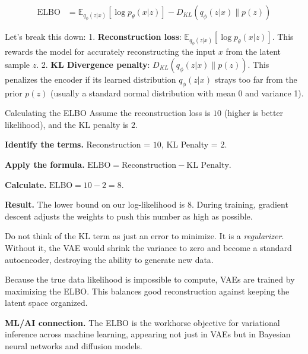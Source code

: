 \documentclass[a4paper,11pt]{article}
\begin{document}
\begin{align}
  \text{ELBO} &= \mathbb{E}_{q_\phi(z|x)} \left[ \log p_\theta(x|z) \right] - D_{KL}(q_\phi(z|x) \parallel p(z))
\end{align}

Let's break this down:
1. \textbf{Reconstruction loss}: $\mathbb{E}_{q_\phi(z|x)} \left[ \log p_\theta(x|z) \right]$. This rewards the model for accurately reconstructing the input $x$ from the latent sample $z$.
2. \textbf{KL Divergence penalty}: $D_{KL}(q_\phi(z|x) \parallel p(z))$. This penalizes the encoder if its learned distribution $q_\phi(z|x)$ strays too far from the prior $p(z)$ (usually a standard normal distribution with mean 0 and variance 1).

\begin{worked}{Calculating the ELBO}
Assume the reconstruction loss is $10$ (higher is better likelihood), and the KL penalty is $2$.
\begin{steps}
  \item \textbf{Identify the terms.} Reconstruction = $10$, KL Penalty = $2$.
  \item \textbf{Apply the formula.} $\text{ELBO} = \text{Reconstruction} - \text{KL Penalty}$.
  \item \textbf{Calculate.} $\text{ELBO} = 10 - 2 = 8$.
  \item \textbf{Result.} The lower bound on our log-likelihood is $8$. During training, gradient descent adjusts the weights to push this number as high as possible.
\end{steps}
\end{worked}

\begin{watchout}
Do not think of the KL term as just an error to minimize. It is a \emph{regularizer}. Without it, the VAE would shrink the variance to zero and become a standard autoencoder, destroying the ability to generate new data.
\end{watchout}

\begin{keytake}
Because the true data likelihood is impossible to compute, VAEs are trained by maximizing the ELBO. This balances good reconstruction against keeping the latent space organized.
\end{keytake}

\noindent\textbf{ML/AI connection.}
The ELBO is the workhorse objective for variational inference across machine learning, appearing not just in VAEs but in Bayesian neural networks and diffusion models.
\end{document}
